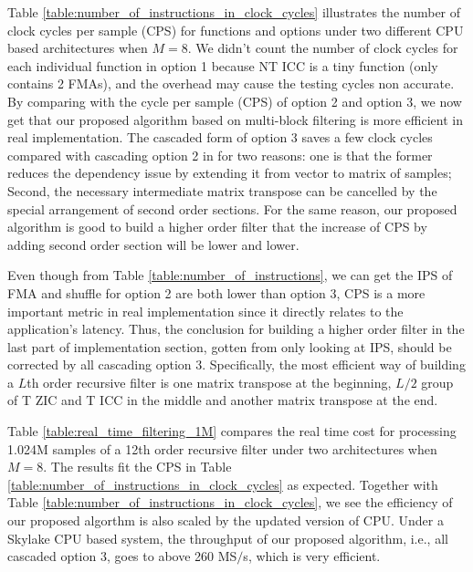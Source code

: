 Table \ref{table:number_of_instructions_in_clock_cycles} illustrates the number of clock cycles per sample (CPS) for functions and options
under two different CPU based architectures when $M{=}8$. We didn't count the number of clock cycles for each individual function in option 1 
because NT ICC is a tiny function (only contains 2 FMAs),
and the overhead may cause the testing cycles non accurate.
By comparing with the cycle per sample (CPS) of option 2 and option 3, we now get that
our proposed algorithm based on multi-block filtering is more efficient in real implementation.
The cascaded form of option 3 saves a few clock cycles compared with cascading option 2 in \cite{Jaewoo_09}
for two reasons: one is that the former reduces the dependency issue
by extending it from vector to matrix of samples; Second, 
the necessary intermediate matrix transpose can be cancelled by the special arrangement of second order sections.  
For the same reason, our proposed algorithm is good to build a higher order filter that 
the increase of CPS by adding second order section will be lower and lower.

Even though from Table \ref{table:number_of_instructions}, we can get the IPS of FMA and shuffle for option 2 are both lower than
option 3, CPS is a more important metric in real implementation since it directly relates to the application's latency.
Thus, the conclusion for building a higher order filter in the last part of implementation section, gotten from only looking at IPS,
should be corrected by all cascading option 3. Specifically, the most efficient way of building 
a $L$th order recursive filter is one matrix transpose at the beginning, $L/2$ group of T ZIC and T ICC in the middle and another matrix transpose at the end.

Table \ref{table:real_time_filtering_1M} compares the real time cost for processing 1.024M samples of a 12th order recursive filter under two architectures when $M=8$. The results fit the CPS in Table \ref{table:number_of_instructions_in_clock_cycles} 
as expected. Together with Table \ref{table:number_of_instructions_in_clock_cycles}, we see the efficiency of our proposed algorthm is also scaled by the updated version of CPU.
Under a Skylake CPU based system, the throughput of our proposed algorithm, i.e., all cascaded option 3, goes to above 260 MS$\slash$s, which is very efficient.













